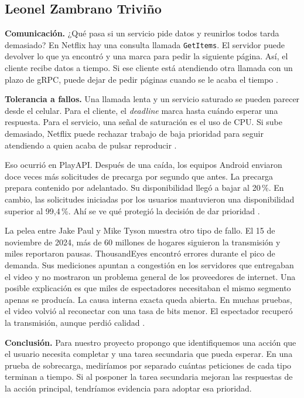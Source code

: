 \subsection*{Leonel Zambrano Triviño}
\textbf{Comunicación.} ¿Qué pasa si un servicio pide datos y reunirlos todos tarda demasiado? En Netflix hay una consulta llamada \texttt{GetItems}. El servidor puede devolver lo que ya encontró y una marca para pedir la siguiente página. Así, el cliente recibe datos a tiempo. Si ese cliente está atendiendo otra llamada con un plazo de gRPC, puede dejar de pedir páginas cuando se le acaba el tiempo \cite{leonel-kv,fallos-grpc}.

\smallskip
\textbf{Tolerancia a fallos.} Una llamada lenta y un servicio saturado se pueden parecer desde el celular. Para el cliente, el \emph{deadline} marca hasta cuándo esperar una respuesta. Para el servicio, una señal de saturación es el uso de CPU. Si sube demasiado, Netflix puede rechazar trabajo de baja prioridad para seguir atendiendo a quien acaba de pulsar reproducir \cite{fallos-grpc,fallos-netflix}.

Eso ocurrió en PlayAPI. Después de una caída, los equipos Android enviaron doce veces más solicitudes de precarga por segundo que antes. La precarga prepara contenido por adelantado. Su disponibilidad llegó a bajar al 20\,\%. En cambio, las solicitudes iniciadas por los usuarios mantuvieron una disponibilidad superior al 99,4\,\%. Ahí se ve qué protegió la decisión de dar prioridad \cite{fallos-netflix}.

La pelea entre Jake Paul y Mike Tyson muestra otro tipo de fallo. El 15 de noviembre de 2024, más de 60 millones de hogares siguieron la transmisión y miles reportaron pausas. ThousandEyes encontró errores durante el pico de demanda. Sus mediciones apuntan a congestión en los servidores que entregaban el video y no mostraron un problema general de los proveedores de internet. Una posible explicación es que miles de espectadores necesitaban el mismo segmento apenas se producía. La causa interna exacta queda abierta. En muchas pruebas, el video volvió al reconectar con una tasa de bits menor. El espectador recuperó la transmisión, aunque perdió calidad \cite{fallos-temple,fallos-thousandeyes}.

\smallskip
\textbf{Conclusión.} Para nuestro proyecto propongo que identifiquemos una acción que el usuario necesita completar y una tarea secundaria que pueda esperar. En una prueba de sobrecarga, mediríamos por separado cuántas peticiones de cada tipo terminan a tiempo. Si al posponer la tarea secundaria mejoran las respuestas de la acción principal, tendríamos evidencia para adoptar esa prioridad.



